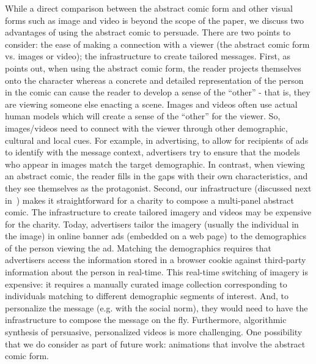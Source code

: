 \begin{description} [leftmargin=\parindent,topsep=0pt,partopsep=3pt,parsep=0pt,itemsep=3pt, listparindent=\parindent]
   \item[Other Media Forms:] While a direct comparison between the abstract comic form and other visual forms such as image and video is beyond the scope of the paper, we discuss two advantages of using the abstract comic to persuade. There are two points to consider: the ease of making a connection with a viewer (the abstract comic form vs. images or video); the infrastructure to create tailored messages. First, as \textcite{mccloud2011making} points out, when using the abstract comic form, the reader projects themselves onto the character whereas a concrete and detailed representation of the person in the comic can cause the reader to develop a sense of the ``other'' - that is, they are viewing someone else enacting a scene. Images and videos often use actual human models which will create a sense of the ``other'' for the viewer. So, images/videos need to connect with the viewer through other demographic, cultural and local cues. For example, in advertising, to allow for recipients of ads to identify with the message context, advertisers try to ensure that the models who appear in images match the target demographic. In contrast, when viewing an abstract comic, the reader fills in the gaps with their own characteristics, and they see themselves as the protagonist. Second, our infrastructure (discussed next in~) makes it straightforward for a charity to compose a multi-panel abstract comic. The infrastructure to create tailored imagery and videos may be expensive for the charity. Today, advertisers tailor the imagery (usually the individual in the image) in online banner ads (embedded on a web page) to the demographics of the person viewing the ad. Matching the demographics requires that advertisers access the information stored in a browser cookie against third-party information about the person in real-time. This real-time switching of imagery is expensive: it requires a manually curated image collection corresponding to individuals matching to different demographic segments of interest. And, to personalize the message (e.g. with the social norm), they would need to have the infrastructure to compose the message on the fly. Furthermore, algorithmic synthesis of persuasive, personalized videos is more challenging. One possibility that we do consider as part of future work: animations that involve the abstract comic form.

\end{description}
